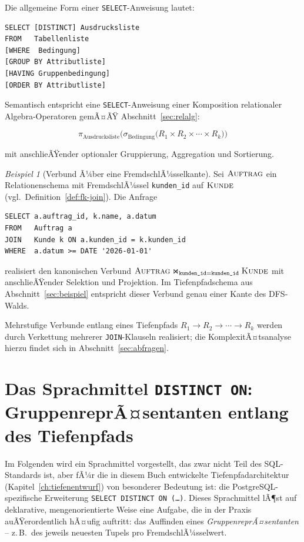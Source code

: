 ﻿\documentclass[a4paper,12pt]{report}
\theoremstyle{definition}
\theoremstyle{remark}
\newtheorem{example}{Beispiel}[chapter]
\begin{document}
Die allgemeine Form einer \texttt{SELECT}-Anweisung lautet:

\begin{lstlisting}
SELECT [DISTINCT] Ausdrucksliste
FROM   Tabellenliste
[WHERE  Bedingung]
[GROUP BY Attributliste]
[HAVING Gruppenbedingung]
[ORDER BY Attributliste]
\end{lstlisting}

Semantisch entspricht eine \texttt{SELECT}-Anweisung einer Komposition
relationaler Algebra-Operatoren gemÃ¤ÃŸ Abschnitt~\ref{sec:relalg}:

\[
\pi_{\text{Ausdrucksliste}}\Big(
  \sigma_{\text{Bedingung}}\big(
    R_1 \times R_2 \times \cdots \times R_k
  \big)
\Big)
\]

mit anschlieÃŸender optionaler Gruppierung, Aggregation und Sortierung.

\begin{example}[Verbund Ã¼ber eine FremdschlÃ¼sselkante]
\label{ex:join-tiefe}
Sei $\textsc{Auftrag}$ ein Relationenschema mit FremdschlÃ¼ssel
\texttt{kunden\_id} auf $\textsc{Kunde}$ (vgl.\ Definition~\ref{def:fk-join}).
Die Anfrage
\begin{lstlisting}
SELECT a.auftrag_id, k.name, a.datum
FROM   Auftrag a
JOIN   Kunde k ON a.kunden_id = k.kunden_id
WHERE  a.datum >= DATE '2026-01-01'
\end{lstlisting}
realisiert den kanonischen Verbund $\textsc{Auftrag}
\Join_{\texttt{kunden\_id}=\texttt{kunden\_id}} \textsc{Kunde}$ mit
anschlieÃŸender Selektion und Projektion. Im Tiefenpfadschema aus
Abschnitt~\ref{sec:beispiel} entspricht dieser Verbund genau
einer Kante des DFS-Walds.
\end{example}

Mehrstufige Verbunde entlang eines Tiefenpfads
$R_1 \rightarrow R_2 \rightarrow \cdots \rightarrow R_k$ werden durch
Verkettung mehrerer \texttt{JOIN}-Klauseln realisiert; die
KomplexitÃ¤tsanalyse hierzu findet sich in
Abschnitt~\ref{sec:abfragen}.

\section{Das Sprachmittel \texttt{DISTINCT ON}: GruppenreprÃ¤sentanten entlang des Tiefenpfads}
\label{sec:distinct-on}

Im Folgenden wird ein Sprachmittel vorgestellt, das zwar nicht Teil des
SQL-Standards ist, aber fÃ¼r die in diesem Buch entwickelte
Tiefenpfadarchitektur (Kapitel~\ref{ch:tiefenentwurf}) von besonderer
Bedeutung ist: die PostgreSQL-spezifische Erweiterung
\texttt{SELECT DISTINCT ON (\ldots)}. Dieses Sprachmittel lÃ¶st auf
deklarative, mengenorientierte Weise eine Aufgabe, die in der Praxis
auÃŸerordentlich hÃ¤ufig auftritt: das Auffinden eines
\emph{GruppenreprÃ¤sentanten} -- z.\,B.\ des jeweils neuesten Tupels pro
FremdschlÃ¼sselwert.
\end{document}
